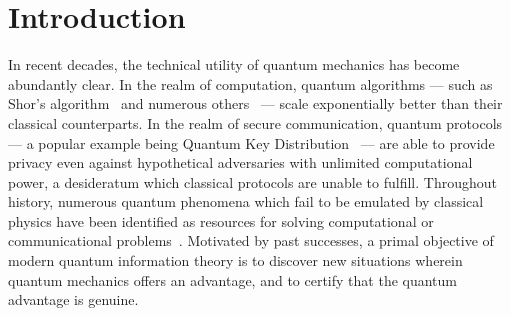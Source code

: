 \documentclass[aps, 10pt, english, twoside, pra, nofootinbib, tightenlines, longbibliography, superscriptaddress]{revtex4-1}
\begin{document}
    \section{Introduction}
    \label{sec:introduction}
    In recent decades, the technical utility of quantum mechanics has become abundantly clear. In the realm of computation, quantum algorithms --- such as Shor's algorithm~\cite{Shor_1997} and numerous others~\cite{Jordan_2016} --- scale exponentially better than their classical counterparts. In the realm of secure communication, quantum protocols --- a popular example being Quantum Key Distribution~\cite{Bennett_2014} --- are able to provide privacy even against hypothetical adversaries with unlimited computational power, a desideratum which classical protocols are unable to fulfill. Throughout history, numerous quantum phenomena which fail to be emulated by classical physics have been identified as resources for solving computational or communicational problems~\cite{Neilsen_Chaung_2011}. Motivated by past successes, a primal objective of modern quantum information theory is to discover new situations wherein quantum mechanics offers an advantage, and to certify that the quantum advantage is genuine.
\end{document}
